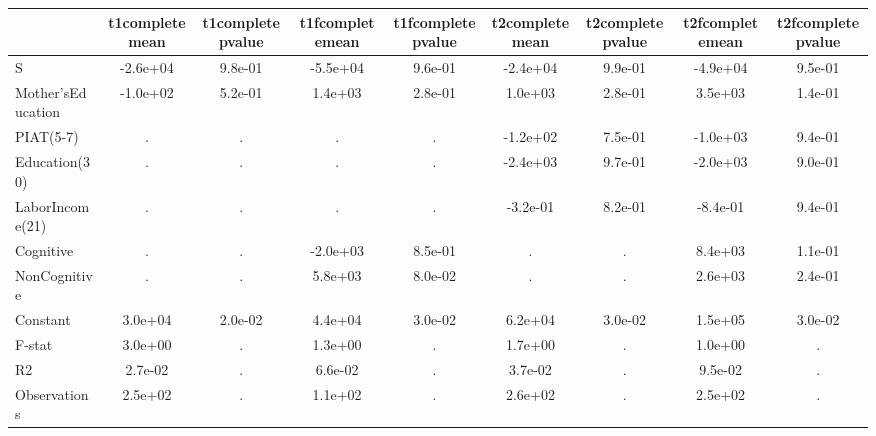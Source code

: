 \begin{table}[htbp]
\begin{tabular}{lcccccccc} \hline \hline
 & t1completemean  & t1completepvalue  & t1fcompletemean  & t1fcompletepvalue  & t2completemean  & t2completepvalue  & t2fcompletemean  & t2fcompletepvalue  \\  \hline 
S & -2.6e+04 &  9.8e-01 & -5.5e+04 &  9.6e-01 & -2.4e+04 &  9.9e-01 & -4.9e+04 &  9.5e-01 \\  
Mother'sEducation & -1.0e+02 &  5.2e-01 &  1.4e+03 &  2.8e-01 &  1.0e+03 &  2.8e-01 &  3.5e+03 &  1.4e-01 \\  
PIAT(5-7) &         . &         . &         . &         . & -1.2e+02 &  7.5e-01 & -1.0e+03 &  9.4e-01 \\  
Education(30) &         . &         . &         . &         . & -2.4e+03 &  9.7e-01 & -2.0e+03 &  9.0e-01 \\  
LaborIncome(21) &         . &         . &         . &         . & -3.2e-01 &  8.2e-01 & -8.4e-01 &  9.4e-01 \\  
Cognitive &         . &         . & -2.0e+03 &  8.5e-01 &         . &         . &  8.4e+03 &  1.1e-01 \\  
NonCognitive &         . &         . &  5.8e+03 &  8.0e-02 &         . &         . &  2.6e+03 &  2.4e-01 \\  
Constant &  3.0e+04 &  2.0e-02 &  4.4e+04 &  3.0e-02 &  6.2e+04 &  3.0e-02 &  1.5e+05 &  3.0e-02 \\  
F-stat &  3.0e+00 &         . &  1.3e+00 &         . &  1.7e+00 &         . &  1.0e+00 &         . \\  
R2 &  2.7e-02 &         . &  6.6e-02 &         . &  3.7e-02 &         . &  9.5e-02 &         . \\  
Observations &  2.5e+02 &         . &  1.1e+02 &         . &  2.6e+02 &         . &  2.5e+02 &         . \\  
\hline \hline \end{tabular}
\end{table}
